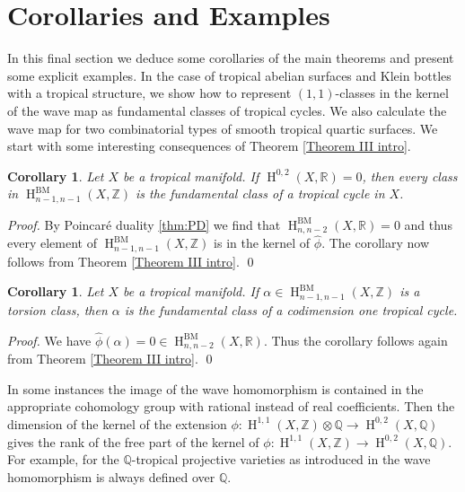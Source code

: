 \documentclass[11pt]{article}
\numberwithin{equation}{numsection}
\newcommand{\Z}{{\mathbb Z}}
\newcommand{\R}{{\mathbb R}}
\newcommand{\phihat}{\hat{\phi}}
\DeclareMathOperator{\BM}{BM}
\DeclareMathOperator{\HH}{H}
\newtheorem{corollary}[thm]{Corollary}
\begin{document}
\section{Corollaries and Examples}

In this final section we deduce some corollaries of the main theorems and present some explicit examples. In the case of tropical abelian surfaces and Klein bottles with a tropical structure, we show how to represent $(1,1)$-classes in the kernel of the wave map as fundamental classes of tropical cycles. We also calculate the wave map for two combinatorial types of  smooth tropical quartic  surfaces. We start with some interesting consequences of Theorem \ref{Theorem III intro}. 

\begin{corollary}\label{cor:zerowave}
Let $X$ be a tropical manifold. 
If $\HH^{0,2}(X, \R) = 0$, then every class in $\HH^{\BM}_{n-1,n-1}(X, \Z) $ is the fundamental class of a tropical cycle in $X$.  
\end{corollary}
\begin{proof}
By Poincar\'e duality \ref{thm:PD} we find that $\HH_{n,n-2}^{\BM}(X, \R) = 0$ and 
thus every element of $\HH^{\BM}_{n-1,n-1}(X, \Z)$ is in the kernel of $\phihat$. 
The corollary now follows from Theorem \ref{Theorem III intro}.
\qed
\end{proof}


\begin{corollary}\label{cor:torsionker}
Let $X$ be a tropical manifold. 
If $\alpha \in \HH_{n-1, n-1}^{\BM}(X, \Z)$ is a torsion class, 
then $\alpha$ is the fundamental class of a codimension  one tropical cycle. 
\end{corollary}
\begin{proof}
We have $\phihat(\alpha) = 0 \in \HH^{\BM}_{n,n-2}(X, \R)$. 
Thus the corollary follows again from Theorem \ref{Theorem III intro}.
\qed
\end{proof}

\begin{rem}{\rm
In some instances the image of the  wave homomorphism is contained in
the appropriate  cohomology group with rational instead of real coefficients. 
Then the dimension of the  kernel of the  extension 
$\phi \colon \HH^{1,1}(X, \Z) \otimes \mathbb{Q} \to \HH^{0,2}(X, \mathbb{Q})$ 
gives the rank of the free part of the kernel of 
$\phi \colon \HH^{1, 1}(X, \Z) \to \HH^{0,2}(X, \mathbb{Q})$. 
For example, for the  $\mathbb{Q}$-tropical projective varieties as introduced in  \cite{IKMZ} 
the wave homomorphism is always defined over $\mathbb{Q}$. }
\end{rem}
\end{document}
